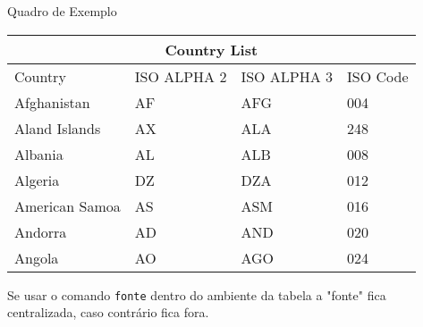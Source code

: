 
\begin{quadro}[!ht]
\caption{\label{quad:exemplo_de_quadro}Quadro de Exemplo}
\centering
\begin{tabular}{ |p{3cm}||p{3cm}|p{3cm}|p{3cm}|  }
\hline
\multicolumn{4}{|c|}{Country List} \\
\hline
Country & ISO ALPHA 2 & ISO ALPHA 3 & ISO Code\\
\hline
Afghanistan   & AF    &AFG&   004\\
Aland Islands&   AX  & ALA   &248\\
Albania &AL & ALB&  008\\
Algeria    &DZ & DZA&  012\\
American Samoa&   AS  & ASM&016\\
Andorra& AD  & AND   &020\\
Angola& AO  & AGO&024\\
\hline
\end{tabular}
\vskip 0.2cm
\end{quadro}
\vspace{0em}
\footnotesize Se usar o comando \texttt{fonte} dentro do ambiente da tabela a "fonte" fica centralizada, caso contrário fica fora.